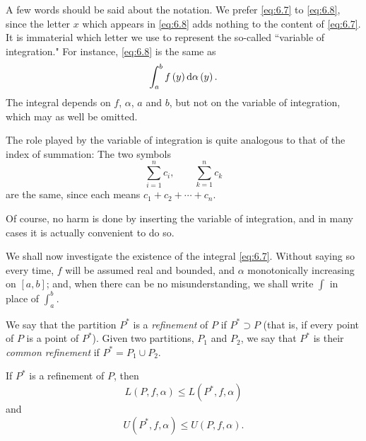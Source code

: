 A few words should be said about the notation. We prefer \eqref{eq:6.7} to \eqref{eq:6.8}, since the letter \(x\) which appears in \eqref{eq:6.8} adds nothing to the content of \eqref{eq:6.7}. It is immaterial which letter we use to represent the so-called ``variable of integration." For instance, \eqref{eq:6.8} is the same as
\begin{equation*}
    \int_a^bf\left(y\right)\odif{\alpha\left(y\right)}.
\end{equation*}
The integral depends on \(f\), \(\alpha\), \(a\) and \(b\), but not on the variable of integration, which may as well be omitted.

The role played by the variable of integration is quite analogous to that of the index of summation: The two symbols
\begin{equation*}
    \sum_{i=1}^nc_i,\qquad\sum_{k=1}^nc_k
\end{equation*}
are the same, since each means \(c_1+c_2+\cdots+c_n\).

Of course, no harm is done by inserting the variable of integration, and in many cases it is actually convenient to do so.

We shall now investigate the existence of the integral \eqref{eq:6.7}. Without saying so every time, \(f\) will be assumed real and bounded, and \(\alpha\) monotonically increasing on \(\left[a,b\right]\); and, when there can be no misunderstanding, we shall write \(\int\) in place of \(\int_a^b\).

\begin{definition}
    We say that the partition \(P^*\) is a \emph{refinement} of \(P\) if \(P^*\supset P\) (that is, if every point of \(P\) is a point of \(P^*\)). Given two partitions, \(P_1\) and \(P_2\), we say that \(P^*\) is their \emph{common refinement} if \(P^*=P_1\cup P_2\).
\end{definition}

\begin{theorem}\label{theorem:6.1}
    If \(P^*\) is a refinement of \(P\), then
    \begin{equation}
        L\left(P,f,\alpha\right)\leqslant L\left(P^*,f,\alpha\right)\label{eq:6.9}
    \end{equation}
    and
    \begin{equation}
        U\left(P^*,f,\alpha\right)\leqslant U\left(P,f,\alpha\right).\label{eq:6.10}
    \end{equation}
\end{theorem}

